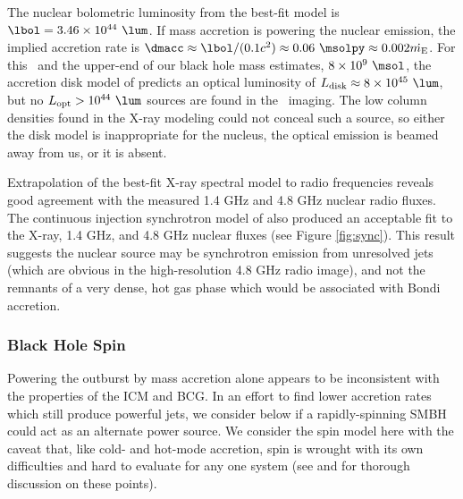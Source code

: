 \documentclass[11pt, preprint]{aastex}
\begin{document}
The nuclear bolometric luminosity from the best-fit model is $\lbol =
3.46 \times 10^{44} ~\lum$. If mass accretion is powering the nuclear
emission, the implied accretion rate is $\dmacc \approx \lbol/(0.1
c^2) \approx 0.06 ~\msolpy \approx 0.002 \dme$. For this \dmacc\ and
the upper-end of our black hole mass estimates, $8 \times 10^{9}
~\msol$, the accretion disk model of \citet{2002NewAR..46..247M}
predicts an optical luminosity of $\ldisk \approx 8 \times 10^{45}
~\lum$, but no $L_{\rm{opt}} > 10^{44} ~\lum$ sources are found in the
\hst\ imaging. The low column densities found in the X-ray modeling
could not conceal such a source, so either the disk model is
inappropriate for the nucleus, the optical emission is beamed away
from us, or it is absent.

Extrapolation of the best-fit X-ray spectral model to radio
frequencies reveals good agreement with the measured 1.4 GHz and 4.8
GHz nuclear radio fluxes. The continuous injection synchrotron model
of \citet{1987MNRAS.225..335H} also produced an acceptable fit to the
X-ray, 1.4 GHz, and 4.8 GHz nuclear fluxes (see Figure
\ref{fig:sync}). This result suggests the nuclear source may be
synchrotron emission from unresolved jets (which are obvious in the
high-resolution 4.8 GHz radio image), and not the remnants of a very
dense, hot gas phase which would be associated with Bondi accretion.

\subsubsection{Black Hole Spin}

Powering the outburst by mass accretion alone appears to be
inconsistent with the properties of the ICM and BCG. In an effort to
find lower accretion rates which still produce powerful jets, we
consider below if a rapidly-spinning SMBH could act as an alternate
power source. We consider the spin model here with the caveat that,
like cold- and hot-mode accretion, spin is wrought with its own
difficulties and hard to evaluate for any one system (see
\citealt{msspin} and \citealt{minaspin} for thorough discussion on
these points).
\end{document}
